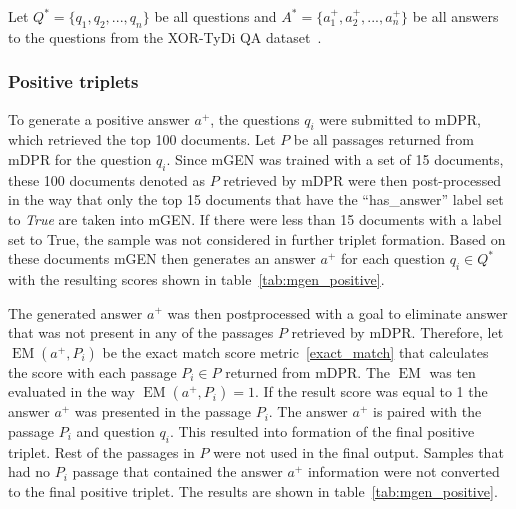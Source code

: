 Let $Q^* = \{q_1, q_2,..., q_n\}$ be all questions and $A^* = \{a_1^+, a_2^+,..., a_n^+\}$ be all answers to the questions from the XOR-TyDi QA dataset~\cite{xortydiqa}.











\subsubsection*{Positive triplets}
To generate a positive answer $a^+$, the questions $q_i$ were submitted to mDPR, which retrieved the top 100 documents. Let $P$ be all passages returned from mDPR for the question $q_i$. Since mGEN was trained with a set of 15 documents, these 100 documents denoted as $P$ retrieved by mDPR were then post-processed in the way that only the top 15 documents that have the ``has\_answer'' label set to \emph{True} are taken into mGEN. If there were less than 15 documents with a label set to True, the sample was not considered in further triplet formation. Based on these documents mGEN then generates an answer $a^+$ for each question $q_i \in Q^*$ with the resulting scores shown in table~\ref{tab:mgen_positive}.

The generated answer $a^+$ was then postprocessed with a goal to eliminate answer that was not present in any of the passages $P$ retrieved by mDPR. Therefore, let $\operatorname{EM}(a^+, P_i)$ be the exact match score metric~\ref{exact_match} that calculates the score with each passage $P_i \in P$ returned from mDPR. The $\operatorname{EM}$ was ten evaluated in the way $\operatorname{EM}(a^+, P_i) = 1$. If the result score was equal to 1 the answer $a^+$ was presented in the passage $P_i$. The answer $a^+$ is paired with the passage $P_i$ and question $q_i$. This resulted into formation of the final positive triplet. Rest of the passages in $P$ were not used in the final output. Samples that had no $P_i$ passage that contained the answer $a^+$ information were not converted to the final positive triplet. The results are shown in table~\ref{tab:mgen_positive}.

